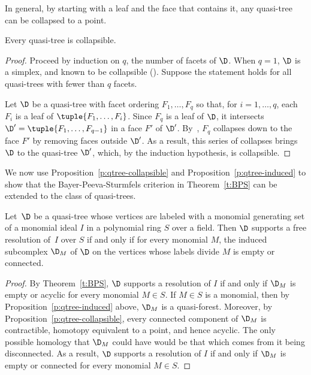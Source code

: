In general, by starting with a leaf and the face that contains it, any
quasi-tree can be collapsed to a point.


\begin{prop}\label{p:qtree-collapsible}
Every quasi-tree is collapsible. 
\end{prop}


\begin{proof} 
Proceed by induction on $q$, the number of facets of $\D$. When $q=1$,
$\D$ is a simplex, and known to be collapsible (\eg \cite[Proposition~2.7]{F14}). Suppose the statement holds for all quasi-trees with
fewer than $q$ facets.

Let $\D$ be a quasi-tree with facet ordering $F_1,\ldots,F_q$ so
that,  for $i=1,\ldots,q$, each $F_i$ is a leaf of $\tuple{F_1,\ldots,F_i}$.  Since $F_q$ is a leaf of $\D$, it intersects
$\D'=\tuple{F_1,\ldots,F_{q-1}}$ in a face $F'$ of $\D'$. By~\cite[Proposition~2.7]{F14}, $F_q$ collapses down to the face
$F'$ by removing faces outside $\D'$. As a result, this series of
collapses brings $\D$ to the quasi-tree $\D'$, which, by the induction
hypothesis, is collapsible. 
\end{proof}



We now use Proposition~\ref{p:qtree-collapsible} and Proposition~\ref{p:qtree-induced} to
show that the Bayer-Peeva-Sturmfels criterion in Theorem~\ref{t:BPS} can be extended to the class
of quasi-trees.

\begin{theorem}\label{t:res-by-quasitree} Let~$\D$ be a quasi-tree whose vertices are labeled
with a monomial generating set of a monomial ideal $I$ in a
polynomial ring $S$ over a field.  Then $\D$ supports a free
resolution of~$I$ over $S$ if and only if for every monomial $M$, the
induced subcomplex $\D_M$ of $\D$ on the vertices whose labels divide
$M$ is empty or connected.
\end{theorem}


\begin{proof} By Theorem~\ref{t:BPS}, $\D$ supports a
resolution of $I$ if and only if $\D_M$ is empty or acyclic for
every monomial $M \in S$. If $M \in S$ is a monomial, then by
Proposition~\ref{p:qtree-induced} above, $\D_M$ is a quasi-forest.  Moreover,
by Proposition~\ref{p:qtree-collapsible}, every connected component of $\D_M$
is contractible, \ie homotopy equivalent to a point, and hence
acyclic. The only possible homology that $\D_M$ could have would be that which comes
from it being disconnected. As a result, $\D$ supports a
resolution of $I$ if and only if $\D_M$ is empty or connected for
every monomial $M \in S$.
\end{proof}


